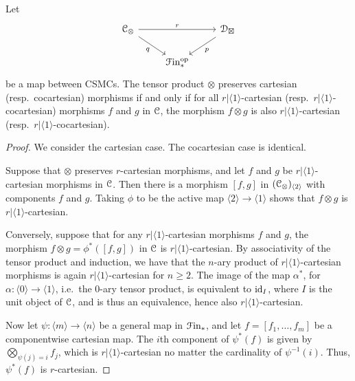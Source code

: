 \documentclass[main.tex]{subfiles}
\begin{document}
\begin{lemma}
  \label{lemma:co_cartesian_preservation_determined_by_bifunctor}
  Let
  \begin{equation*}
    \begin{tikzcd}
      \category{C}_{\otimes}
      \arrow[rr, "r"]
      \arrow[dr, swap, "q"]
      && \category{D}_{\boxtimes}
      \arrow[dl, "p"]
      \\
      & \Finp\op
    \end{tikzcd}
  \end{equation*}
  be a map between CSMCs. The tensor product $\otimes$ preserves cartesian (resp.\ cocartesian) morphisms if and only if for all $r|\langle 1 \rangle$-cartesian (resp.\ $r|\langle 1 \rangle$-cocartesian) morphisms $f$ and $g$ in $\mathcal{C}$, the morphism $f \otimes g$ is also $r|\langle 1 \rangle$-cartesian (resp.\ $r|\langle 1 \rangle$-cocartesian).
\end{lemma}
\begin{proof}
  We consider the cartesian case. The cocartesian case is identical.

  Suppose that $\otimes$ preserves $r$-cartesian morphisms, and let $f$ and $g$ be $r|\langle 1 \rangle$-cartesian morphisms in $\mathcal{C}$. Then there is a morphism $[f, g]$ in $( \mathcal{C}_{\otimes} )_{\langle 2 \rangle}$ with components $f$ and $g$. Taking $\phi$ to be the active map $\langle 2 \rangle \to \langle 1 \rangle$ shows that $f \otimes g$ is $r|\langle 1 \rangle$-cartesian.

  Conversely, suppose that for any $r|\langle 1 \rangle$-cartesian morphisms $f$ and $g$, the morphism $f \otimes g = \phi^{*}([f, g])$ in $\mathcal{C}$ is $r|\langle 1 \rangle$-cartesian. By associativity of the tensor product and induction, we have that the $n$-ary product of $r|\langle 1 \rangle$-cartesian morphisms is again $r|\langle 1 \rangle$-cartesian for $n \geq 2$. The image of the map $\alpha^{*}$, for $\alpha\colon \langle 0 \rangle \to \langle 1 \rangle$, i.e.\ the 0-ary tensor product, is equivalent to $\mathrm{id}_{I}$, where $I$ is the unit object of $\mathcal{C}$, and is thus an equivalence, hence also $r|\langle 1 \rangle$-cartesian.

  Now let $\psi\colon \langle m \rangle \to \langle n \rangle$ be a general map in $\mathcal{F}\mathrm{in}_{*}$, and let $f = [f_{1}, \ldots, f_{m}]$ be a componentwise cartesian map. The $i$th component of $\psi^{*}(f)$ is given by $\bigotimes_{\psi(j) = i} f_{j}$, which is $r|\langle 1 \rangle$-cartesian no matter the cardinality of $\psi^{-1}(i)$. Thus, $\psi^{*}(f)$ is $r$-cartesian.
\end{proof}
\end{document}
